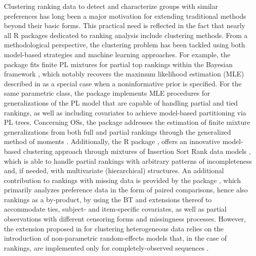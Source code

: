 {Clustering ranking data to detect and characterize groups with similar preferences has long been a major motivation for extending traditional methods beyond their basic forms. This practical need is reflected in the fact that nearly all \textsf{R} packages dedicated to ranking analysis include clustering methods. From a methodological perspective, the clustering problem has been tackled using both model-based strategies and machine learning approaches. For example, the  package \citep{mollica2020plmix} fits finite PL mixtures for partial top rankings within the Bayesian framework \citep{mollica2017bayesian}, which notably recovers the maximum likelihood estimation (MLE) described in \cite{gormley2006analysis} as a special case when a noninformative prior is specified. For the same parametric class, the  package \citep{turner2020} implements MLE procedures for generalizations of the PL model that are capable of handling partial and tied rankings, as well as including covariates to achieve model-based partitioning via PL trees. 
Concerning OSs, the  package addresses the estimation of finite mixture generalizations from both full and partial rankings through the generalized method of moments \citep{soufiani}.
Additionally, the \textsf{R} package  \citep{Rankcluster}, offers an innovative model-based clustering approach through mixtures of Insertion Sort Rank data models \citep{Jacques2014}, which is able to handle partial rankings with arbitrary patterns of incompleteness and, if needed, with multivariate (hierarchical) structures.
An additional contribution to rankings with missing data is provided by the  package \citep{prefmod2012}, which primarily analyzes preference data in the form of paired comparisons, hence also rankings as a by-product, by using the BT and extensions thereof to accommodate ties, subject- and item-specific covariates, as well as partial observations with different censoring forms and missingness processes. However, the extension proposed in \citet{prefmod2012} for clustering heterogeneous data relies on the introduction of non-parametric random-effects models that, in the case of rankings, are implemented only for completely-observed sequences \citep{prefmod.package}.}

